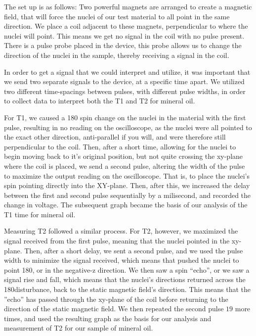 \documentclass{article}
\begin{document}
    The set up is as follows: Two powerful magnets are arranged to create a magnetic field, that will force the nuclei of our test material to all point in the same direction. We place a coil adjacent to these magnets, perpendicular to where the nuclei will point. This means we get no signal in the coil with no pulse present. There is a pulse probe placed in the device, this probe allows us to change the direction of the nuclei in the sample, thereby receiving a signal in the coil. 
    
    \bigskip
    
    In order to get a signal that we could interpret and utilize, it was important that we send two separate signals to the device, at a specific time apart. We utilized two different time-spacings between pulses, with different pulse widths, in order to collect data to interpret both the T1 and T2 for mineral oil. 
     
    
    \bigskip
    
    
    For T1, we caused a 180 \degree spin change on the nuclei in the material with the first pulse, resulting in no reading on the oscilloscope, as the nuclei were all pointed to the exact other direction, anti-parallel if you will, and were therefore still perpendicular to the coil. Then, after a short time, allowing for the nuclei to begin moving back to it's original position, but not quite crossing the xy-plane where the coil is placed, we send a second pulse, altering the width of the pulse to maximize the output reading on the oscilloscope. That is, to place the nuclei's spin pointing directly into the XY-plane. Then, after this, we increased the delay between the first and second pulse sequentially by a milisecond, and recorded the change in voltage. The subsequent graph became the basis of our analysis of the T1 time for mineral oil.
     
    
    \bigskip
    
    
    Measuring T2 followed a similar process. For T2, however, we maximized the signal received from the first pulse, meaning that the nuclei pointed in the xy-plane. Then, after a short delay, we sent a second pulse, and we used the pulse width to minimize the signal received, which means that pushed the nuclei to point 180\degree, or in the negative-z direction. We then saw a spin “echo”, or we saw a signal rise and fall, which means that the nuclei’s directions returned across the 180\degree disturbance, back to the static magnetic field’s direction. This means that the ”echo” has passed through the xy-plane of the coil before returning to the direction of the static magnetic field. We then repeated the second pulse $19$ more times, and used the resulting graph as the basis for our analysis and measurement of T2 for our sample of mineral oil.
 
\end{document}
